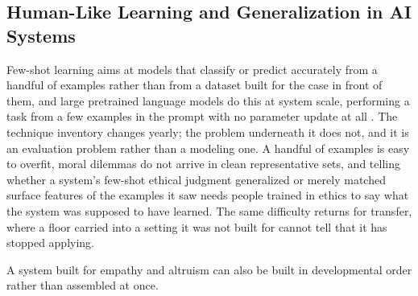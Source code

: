 \subsection{Human-Like Learning and Generalization in AI Systems}
\label{sec:4.1.3}
Few-shot learning aims at models that classify or predict accurately from a handful of examples rather than from a dataset built for the case in front of them, and large pretrained language models do this at system scale, performing a task from a few examples in the prompt with no parameter update at all \autocite{brown2020fewshot}. The technique inventory changes yearly; the problem underneath it does not, and it is an evaluation problem rather than a modeling one. A handful of examples is easy to overfit, moral dilemmas do not arrive in clean representative sets, and telling whether a system's few-shot ethical judgment generalized or merely matched surface features of the examples it saw needs people trained in ethics to say what the system was supposed to have learned. The same difficulty returns for transfer, where a floor carried into a setting it was not built for cannot tell that it has stopped applying.

A system built for empathy and altruism can also be built in developmental order rather than assembled at once.
